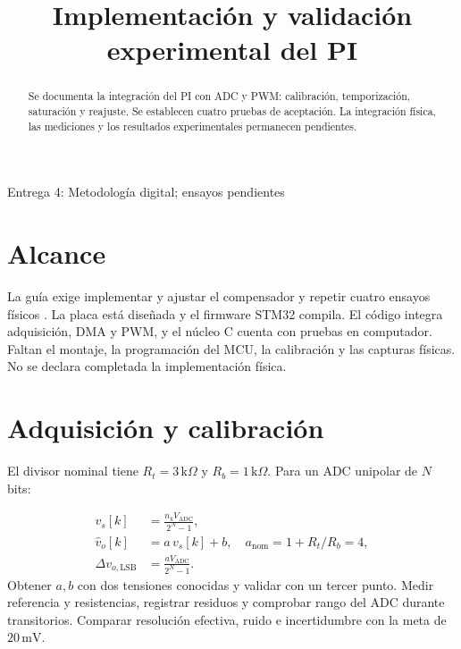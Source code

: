 \documentclass[conference,letterpaper]{IEEEtran}
\begin{document}
\title{Implementación y validación experimental del PI}\author{
}
\maketitle
\begin{center}\small Entrega 4: Metodología digital; ensayos pendientes\end{center}
\begin{abstract}Se documenta la integración del PI con ADC y PWM: calibración, temporización, saturación y reajuste. Se establecen cuatro pruebas de aceptación. La integración física, las mediciones y los resultados experimentales permanecen pendientes.\end{abstract}
\section{Alcance}
La guía exige implementar y ajustar el compensador y repetir cuatro ensayos físicos \cite{guide}. La placa está diseñada y el firmware STM32 compila. El código integra adquisición, DMA y PWM, y el núcleo C cuenta con pruebas en computador. Faltan el montaje, la programación del MCU, la calibración y las capturas físicas. No se declara completada la implementación física.

\section{Adquisición y calibración}
El divisor nominal tiene $R_t=3\,\mathrm{k}\Omega$ y $R_b=1\,\mathrm{k}\Omega$. Para un ADC unipolar de $N$ bits:

\begin{equation}\label{eq:adc}\begin{aligned}v_s[k]&=\frac{n_kV_{\mathrm{ADC}}}{2^N-1},\\\hat v_o[k]&=a\,v_s[k]+b,\quad a_{\mathrm{nom}}=1+R_t/R_b=4,\\\Delta v_{o,\mathrm{LSB}}&=\frac{aV_{\mathrm{ADC}}}{2^N-1}.\end{aligned}\end{equation}
Obtener $a,b$ con dos tensiones conocidas y validar con un tercer punto. Medir referencia y resistencias, registrar residuos y comprobar rango del ADC durante transitorios. Comparar resolución efectiva, ruido e incertidumbre con la meta de $20\,\mathrm{mV}$.
\end{document}
